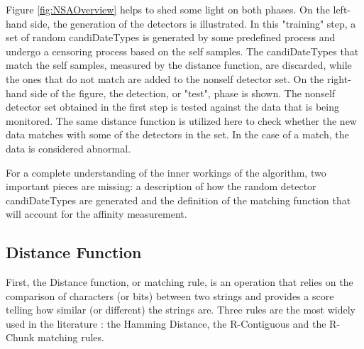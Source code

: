 Figure \ref{fig:NSAOverview} helps to shed some light on both phases. On the left-hand side, the generation of the detectors is illustrated. In this "training" step, a set of random candiDateTypes is generated by some predefined process and undergo a censoring process based on the self samples. The candiDateTypes that match the self samples, measured by the distance function, are discarded, while the ones that do not match are added to the nonself detector set. On the right-hand side of the figure, the detection, or "test", phase is shown. The nonself detector set obtained in the first step is tested against the data that is being monitored. The same distance function is utilized here to check whether the new data matches with some of the detectors in the set. In the case of a match, the data is considered abnormal.

For a complete understanding of the inner workings of the algorithm, two important pieces are missing: a description of how the random detector candiDateTypes are generated and the definition of the matching function that will account for the affinity measurement.

\subsection{Distance Function} \label{sec:bgNSADistance}


First, the Distance function, or matching rule, is an operation that relies on the comparison of characters (or bits) between two strings and provides a score telling how similar (or different) the strings are. Three rules are the most widely used in the literature \cite{EffectBinaryRule2003}: the Hamming Distance, the R-Contiguous and the R-Chunk matching rules. 


